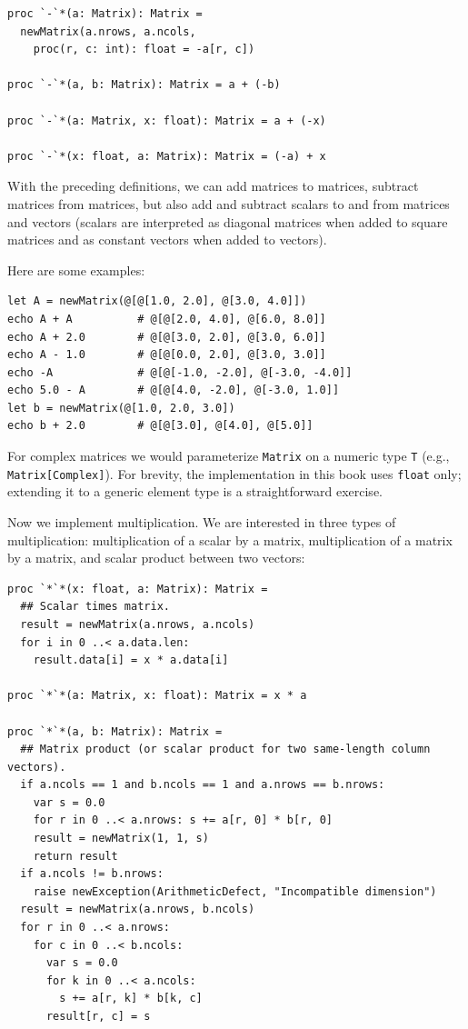 \documentclass[justified, sixbynine]{tufte-book}
\def\ft{\small\tt}
\theoremstyle{plain}%
\newtheorem * {corollary}{Corollary}
\theoremstyle{definition}
\theoremstyle{remark}
\newtheorem * {remark}{Remark}
\newtheorem * {note}{Note}
\begin{document}
\begin{fullwidth}
\begin{lstlisting}[caption={in file: {\ft nlib/matrix.nim}}]
proc `-`*(a: Matrix): Matrix =
  newMatrix(a.nrows, a.ncols,
    proc(r, c: int): float = -a[r, c])

proc `-`*(a, b: Matrix): Matrix = a + (-b)

proc `-`*(a: Matrix, x: float): Matrix = a + (-x)

proc `-`*(x: float, a: Matrix): Matrix = (-a) + x
\end{lstlisting}
With the preceding definitions, we can add matrices to matrices, subtract matrices from matrices, but also add and subtract scalars to and from matrices and vectors
(scalars are interpreted as diagonal matrices when added to square matrices and as constant vectors when added to vectors).

Here are some examples:

\begin{lstlisting}
let A = newMatrix(@[@[1.0, 2.0], @[3.0, 4.0]])
echo A + A          # @[@[2.0, 4.0], @[6.0, 8.0]]
echo A + 2.0        # @[@[3.0, 2.0], @[3.0, 6.0]]
echo A - 1.0        # @[@[0.0, 2.0], @[3.0, 3.0]]
echo -A             # @[@[-1.0, -2.0], @[-3.0, -4.0]]
echo 5.0 - A        # @[@[4.0, -2.0], @[-3.0, 1.0]]
let b = newMatrix(@[1.0, 2.0, 3.0])
echo b + 2.0        # @[@[3.0], @[4.0], @[5.0]]
\end{lstlisting}

For complex matrices we would parameterize {\ft Matrix} on a numeric type {\ft T} (e.g., {\ft Matrix[Complex]}). For brevity, the implementation in this book uses {\ft float} only; extending it to a generic element type is a straightforward exercise.

Now we implement multiplication. We are interested in three types of multiplication: multiplication of a scalar by a matrix, multiplication of a matrix by a matrix, and scalar product between two vectors:

\begin{lstlisting}[caption={in file: {\ft nlib/matrix.nim}}]
proc `*`*(x: float, a: Matrix): Matrix =
  ## Scalar times matrix.
  result = newMatrix(a.nrows, a.ncols)
  for i in 0 ..< a.data.len:
    result.data[i] = x * a.data[i]

proc `*`*(a: Matrix, x: float): Matrix = x * a

proc `*`*(a, b: Matrix): Matrix =
  ## Matrix product (or scalar product for two same-length column vectors).
  if a.ncols == 1 and b.ncols == 1 and a.nrows == b.nrows:
    var s = 0.0
    for r in 0 ..< a.nrows: s += a[r, 0] * b[r, 0]
    result = newMatrix(1, 1, s)
    return result
  if a.ncols != b.nrows:
    raise newException(ArithmeticDefect, "Incompatible dimension")
  result = newMatrix(a.nrows, b.ncols)
  for r in 0 ..< a.nrows:
    for c in 0 ..< b.ncols:
      var s = 0.0
      for k in 0 ..< a.ncols:
        s += a[r, k] * b[k, c]
      result[r, c] = s
\end{lstlisting}


\end{fullwidth}
\end{document}
